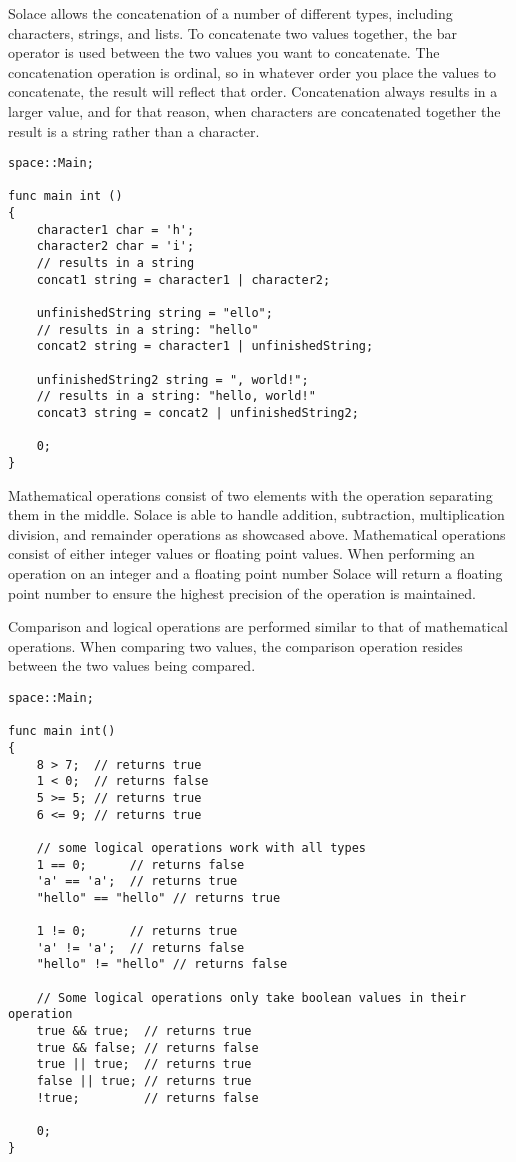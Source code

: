 \documentclass{article}
\begin{document}
Solace allows the concatenation of a number of different types, including characters, strings, and lists. To concatenate two values together, the bar operator 
is used between the two values you want to concatenate. The concatenation operation is ordinal, so in whatever order you place the values to concatenate, the
result will reflect that order. Concatenation always results in a larger value, and for that reason, when characters are concatenated together the result is a
string rather than a character.

\begin{lstlisting}
space::Main;

func main int ()
{
	character1 char = 'h';
	character2 char = 'i';
	// results in a string
	concat1 string = character1 | character2;

	unfinishedString string = "ello";
	// results in a string: "hello"
	concat2 string = character1 | unfinishedString;

	unfinishedString2 string = ", world!";
	// results in a string: "hello, world!"
	concat3 string = concat2 | unfinishedString2;

	0;
}
\end{lstlisting}

Mathematical operations consist of two elements with the operation separating them in the middle. Solace is able to handle addition, subtraction, multiplication
division, and remainder operations as showcased above. Mathematical operations consist of either integer values or floating point values. When performing an
operation on an integer and a floating point number Solace will return a floating point number to ensure the highest precision of the operation is maintained.

Comparison and logical operations are performed similar to that of mathematical operations. When comparing two values, the comparison operation resides between the two
values being compared.

\begin{lstlisting}
space::Main;

func main int()
{
	8 > 7;  // returns true
	1 < 0;  // returns false
	5 >= 5; // returns true
	6 <= 9; // returns true

	// some logical operations work with all types
	1 == 0;      // returns false
	'a' == 'a';  // returns true
	"hello" == "hello" // returns true

	1 != 0;      // returns true
	'a' != 'a';  // returns false
	"hello" != "hello" // returns false

	// Some logical operations only take boolean values in their operation
	true && true;  // returns true
	true && false; // returns false
	true || true;  // returns true
	false || true; // returns true
	!true;		   // returns false

	0;
}
\end{lstlisting}
\end{document}
